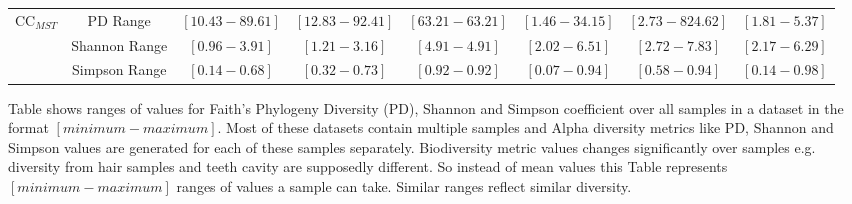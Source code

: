 \documentclass[10pt, conference, compsocconf]{IEEEtran}
\begin{document}
\begin{table}[t]
{\begin{tabular}{|c|c c c c| c c c|}
			\hline
			
			\multirow{3}{*}{CC$_{MST}$} & PD Range & $\left[10.43-89.61\right]$ & $\left[12.83-92.41\right]$ & $\left[63.21-63.21\right]$ & $\left[1.46-34.15\right]$ & $\left[2.73-824.62\right]$ & $\left[1.81-5.37\right]$\\ 
			& Shannon Range & $\left[0.96-3.91\right]$ & $\left[1.21-3.16\right]$ & $\left[4.91-4.91\right]$ & $\left[2.02-6.51\right]$ & $\left[2.72-7.83\right]$ & $\left[2.17-6.29\right]$\\
			& Simpson Range & $\left[0.14-0.68\right]$ & $\left[0.32-0.73\right]$ & $\left[0.92-0.92\right]$ & $\left[0.07-0.94\right]$ & $\left[0.58-0.94\right]$ & $\left[0.14-0.98\right]$\\
			
			\hline
			
		\end{tabular}
	}
	\small
	\begin{tablenotes}
		\item Table shows ranges of values for Faith’s Phylogeny Diversity (PD), Shannon and Simpson coefficient over all samples in a dataset in the format $[minimum-maximum]$. Most of these datasets contain multiple samples and Alpha diversity metrics like PD, Shannon and Simpson values are generated for each of these samples separately. Biodiversity metric values changes significantly over samples e.g. diversity from hair samples and teeth cavity are supposedly different. So instead of mean values this Table represents $[minimum-maximum]$  ranges of values a sample can take. Similar ranges reflect similar diversity.      
	\end{tablenotes}
	
\end{table} 
\end{document}
